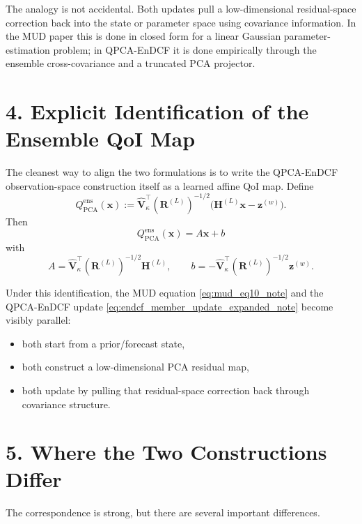 \documentclass[11pt]{article}
\begin{document}
The analogy is not accidental. Both updates pull a low-dimensional residual-space correction back into the state or parameter space using covariance information. In the MUD paper this is done in closed form for a linear Gaussian parameter-estimation problem; in QPCA-EnDCF it is done empirically through the ensemble cross-covariance and a truncated PCA projector.

\section*{4. Explicit Identification of the Ensemble QoI Map}

The cleanest way to align the two formulations is to write the QPCA-EnDCF observation-space construction itself as a learned affine QoI map. Define
\begin{equation}
Q_{\mathrm{PCA}}^{\mathrm{ens}}(\mathbf{x})
:=
\hat{\mathbf{V}}_\kappa^\top
(\mathbf{R}^{(L)})^{-1/2}
\bigl(\mathbf{H}^{(L)}\mathbf{x}-\mathbf{z}^{(w)}\bigr).
\label{eq:ensemble_qoi_map_note}
\end{equation}
Then
\begin{equation}
Q_{\mathrm{PCA}}^{\mathrm{ens}}(\mathbf{x})
=
A\mathbf{x}+b
\end{equation}
with
\begin{equation}
A
=
\hat{\mathbf{V}}_\kappa^\top
(\mathbf{R}^{(L)})^{-1/2}\mathbf{H}^{(L)},
\qquad
b
=
-\hat{\mathbf{V}}_\kappa^\top
(\mathbf{R}^{(L)})^{-1/2}\mathbf{z}^{(w)}.
\label{eq:ensemble_A_b_note}
\end{equation}

Under this identification, the MUD equation \eqref{eq:mud_eq10_note} and the QPCA-EnDCF update \eqref{eq:endcf_member_update_expanded_note} become visibly parallel:
\begin{itemize}
\item both start from a prior/forecast state,
\item both construct a low-dimensional PCA residual map,
\item both update by pulling that residual-space correction back through covariance structure.
\end{itemize}

\section*{5. Where the Two Constructions Differ}

The correspondence is strong, but there are several important differences.
\end{document}
